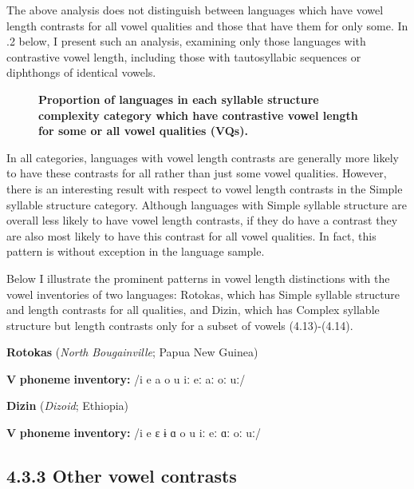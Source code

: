   The above analysis does not distinguish between languages which have vowel length contrasts for all vowel qualities and those that have them for only some. In .2 below, I present such an analysis, examining only those languages with contrastive vowel length, including those with tautosyllabic sequences or diphthongs of identical vowels.



\begin{figure}

\textbf{ Proportion of languages in each syllable structure complexity category which have contrastive vowel length for some or all vowel qualities (VQs).}
\end{figure}


  In all categories, languages with vowel length contrasts are generally more likely to have these contrasts for all rather than just some vowel qualities. However, there is an interesting result with respect to vowel length contrasts in the Simple syllable structure category. Although languages with Simple syllable structure are overall less likely to have vowel length contrasts, if they do have a contrast they are also most likely to have this contrast for all vowel qualities. In fact, this pattern is without exception in the language sample.



  Below I illustrate the prominent patterns in vowel length distinctions with the vowel inventories of two languages: Rotokas, which has Simple syllable structure and length contrasts for all qualities, and Dizin, which has Complex syllable structure but length contrasts only for a subset of vowels (4.13)-(4.14).



\ea\label{ex:(4.13)}
  \textbf{Rotokas} (\textit{North} \textit{Bougainville}; Papua New Guinea)



\textbf{V} \textbf{phoneme} \textbf{inventory:} /i e a o u iː eː aː oː uː/
\z



\ea\label{ex:(4.14)}
  \textbf{Dizin} (\textit{Dizoid}; Ethiopia)



\textbf{V} \textbf{phoneme} \textbf{inventory:} /i e ɛ ɨ ɑ o u iː eː ɑː oː uː/
\z


\subsection{4.3.3 Other vowel contrasts}

